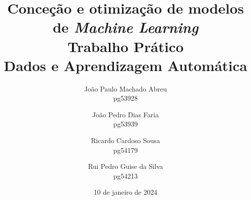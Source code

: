 \title{Conceção e otimização de modelos de \textit{Machine Learning}\\
       \textbf{Trabalho Prático}\\
       Dados e Aprendizagem Automática}

\author{João Paulo Machado Abreu \\ pg53928
        \and João Pedro Dias Faria \\ pg53939
        \and Ricardo Cardoso Sousa \\ pg54179
        \and Rui Pedro Guise da Silva \\ pg54213}

\date{10 de janeiro de 2024}

\maketitle

